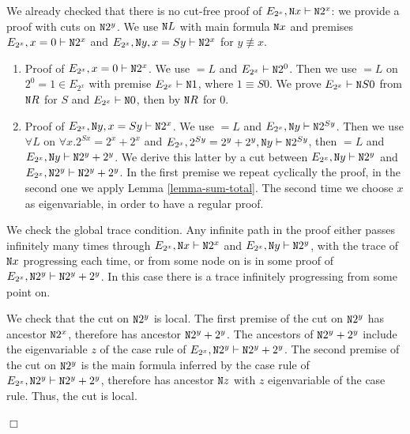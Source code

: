 \documentclass[a4paper,12pt]{article}
\newenvironment{proof}[1][Proof]{\begin{trivlist}
\item[\hskip \labelsep {\bfseries #1}]}{\end{trivlist}}
\newcommand{\Nat}               { {\tt N}  }
\newcommand{\eqL}     {= \! \!  \!  L}
\begin{document}
\begin{proof}
We already checked that there is no cut-free proof of $E_{2^x}, \Nat x \vdash \Nat 2^x$: we provide a proof with cuts on $\Nat 2^y$. We use $\Nat L$ with main formula $\Nat x$ and premises $E_{2^x}, x=0 \vdash \Nat 2^x$ and $E_{2^x}, \Nat y, x = Sy\vdash \Nat 2^x$ for $y \not \equiv x$. 
\begin{enumerate}
\item
Proof of $E_{2^x}, x=0 \vdash \Nat 2^x$. We use $\eqL$ and $E_{2^x} \vdash \Nat 2^0$. Then we use $\eqL$ on $2^0=1 \in E_{2^x}$ with premise $E_{2^x} \vdash \Nat 1$, where $1 \equiv S0$. We prove $E_{2^x} \vdash \Nat S0$ from $\Nat R$ for $S$ and $E_{2^x} \vdash \Nat 0$, then by $\Nat R$ for $0$. 
\item
Proof of $E_{2^x}, \Nat y, x = Sy\vdash \Nat 2^x$. We use $\eqL$ and $E_{2^x}, \Nat y \vdash \Nat 2^{Sy}$. Then we use $\forall L$ on $\forall x.2^{Sx} = 2^x + 2^x$ and $E_{2^x}, 2^{Sy} = 2^y + 2^y, \Nat y\vdash \Nat 2^{Sy}$, then $\eqL$ and $E_{2^x}, \Nat y \vdash \Nat 2^y + 2^y$. We derive this latter by a cut between $E_{2^x}, \Nat y \vdash \Nat 2^y$ and $E_{2^x}, \Nat 2^y \vdash \Nat 2^y + 2^y$. In the first premise we repeat cyclically the proof, in the second one we apply Lemma \ref{lemma-sum-total}. The second time we choose $x$ as eigenvariable, in order to have a regular proof. 
\end{enumerate}
We check the global trace condition. Any infinite path in the proof either passes infinitely many times through $E_{2^x}, \Nat x \vdash \Nat 2^x$ and $E_{2^x}, \Nat y \vdash \Nat 2^y$, with the trace of $\Nat x$ progressing each time, or from some node on is in some proof of $E_{2^x}, \Nat 2^y \vdash \Nat 2^y + 2^y$. In this case there is a trace infinitely progressing from some point on. 

We check that the cut on $\Nat 2^y$ is local. The first premise of the cut on $\Nat 2^y$ has ancestor $\Nat 2^x$, therefore has ancestor $\Nat 2^y + 2^y$. The ancestors of  $\Nat 2^y + 2^y$ include the eigenvariable $z$ of the case rule of $E_{2^x}, \Nat 2^y \vdash \Nat 2^y + 2^y$. The second premise of the cut on $\Nat 2^y$ is the main formula inferred by the case rule of $E_{2^x}, \Nat 2^y \vdash \Nat 2^y + 2^y$, therefore has ancestor $\Nat z$ with $z$ eigenvariable of the case rule. Thus, the cut is local.

$\Box$ \end{proof}

\end{document}
